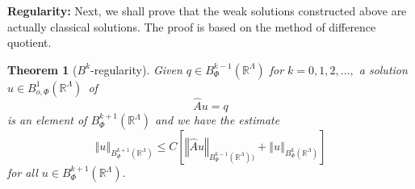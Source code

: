 \documentclass{article}
\newtheorem{theorem}{Theorem}
\begin{document}
\textbf{Regularity: }Next, we shall prove that the weak solutions
constructed above are actually classical solutions. The proof is based on
the method of difference quotient.

\begin{theorem}[$B^{k}$-regularity]
\textit{Given }$q\in B_{\Phi }^{k-1}(\mathbb{R}^{\Lambda })$ \textit{for }$%
k=0,1,2,...,$ \textit{a solution }$u\in B_{o,\Phi }^{1}(\mathbb{R}^{\Lambda
})$\textit{\ of }%
\begin{equation}
\hat{A}u=q
\end{equation}%
\textit{is an element of }$B_{\Phi }^{k+1}(\mathbb{R}^{\Lambda })$ \textit{%
and we have the estimate}%
\begin{equation}
\left\Vert u\right\Vert _{B_{\Phi }^{k+1}(\mathbb{R}^{\Lambda })}\leq C\left[
\left\Vert \hat{A}u\right\Vert _{B_{\Phi }^{k-1}(\mathbb{R}^{\Lambda
}))}+\left\Vert u\right\Vert _{B_{\Phi }^{k}(\mathbb{R}^{\Lambda })}\right]
\end{equation}%
\textit{for all }$u\in B_{\Phi }^{k+1}(\mathbb{R}^{\Lambda }).$
\end{theorem}
\end{document}
